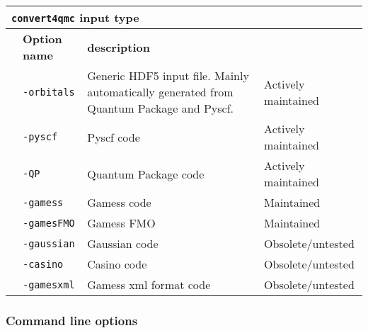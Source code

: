 \begin{table}[h]
\begin{center}
\begin{tabularx}{\textwidth}{l l l l }
\hline
\multicolumn{4}{l}{\texttt{convert4qmc} input type} \\
\hline
   &   \bfseries Option name     &\bfseries description \\
   &   \texttt{-orbitals    } &  Generic HDF5 input file. Mainly automatically generated from Quantum Package and Pyscf.  & Actively maintained\\
   &   \texttt{-pyscf       } &  Pyscf code & Actively maintained\\
   &   \texttt{-QP          } &  Quantum Package code & Actively maintained\\
   &   \texttt{-gamess      } &  Gamess code & Maintained\\
   &   \texttt{-gamesFMO    } &  Gamess FMO & Maintained\\
   &   \texttt{-gaussian    } &  Gaussian code & Obsolete/untested \\
   &   \texttt{-casino      } &  Casino code & Obsolete/untested \\
   &   \texttt{-gamesxml    } &  Gamess xml format code  & Obsolete/untested\\
    \hline

    \end{tabularx}
\end{center}
\end{table}

\subsubsection{Command line options}

